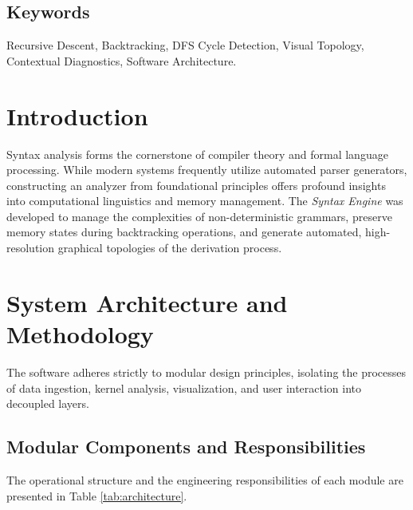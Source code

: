 \documentclass[12pt,a4paper]{article}
\begin{document}
    \subsection*{Keywords}
    Recursive Descent, Backtracking, DFS Cycle Detection, Visual Topology, Contextual Diagnostics, Software Architecture.

    \section{Introduction}
    Syntax analysis forms the cornerstone of compiler theory and formal language processing. While modern systems frequently utilize automated parser generators, constructing an analyzer from foundational principles offers profound insights into computational linguistics and memory management. The \textit{Syntax Engine} was developed to manage the complexities of non-deterministic grammars, preserve memory states during backtracking operations, and generate automated, high-resolution graphical topologies of the derivation process.

    \section{System Architecture and Methodology}
    The software adheres strictly to modular design principles, isolating the processes of data ingestion, kernel analysis, visualization, and user interaction into decoupled layers.

    \subsection{Modular Components and Responsibilities}
    The operational structure and the engineering responsibilities of each module are presented in Table \ref{tab:architecture}.
\end{document}
